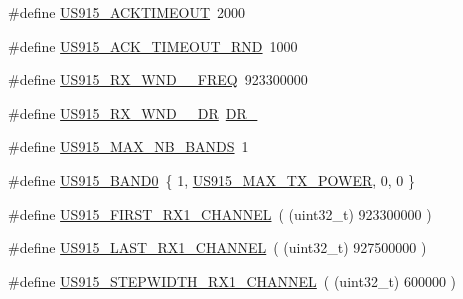\begin{DoxyCompactItemize}
\item 
\#define \hyperlink{group__REGIONUS915_ga4c39b2179e634fc588eb206e5b24fb8e}{U\+S915\+\_\+\+A\+C\+K\+T\+I\+M\+E\+O\+UT}~2000
\item 
\#define \hyperlink{group__REGIONUS915_ga96a643ec88acfe0188587fd0ed6251e5}{U\+S915\+\_\+\+A\+C\+K\+\_\+\+T\+I\+M\+E\+O\+U\+T\+\_\+\+R\+ND}~1000
\item 
\#define \hyperlink{group__REGIONUS915_ga0789b26b7a379ca9e5b13782bed55879}{U\+S915\+\_\+\+R\+X\+\_\+\+W\+N\+D\+\_\+\_\+\+F\+R\+EQ}~923300000
\item 
\#define \hyperlink{group__REGIONUS915_ga51bf1d4da5e2926fb30c0e7b2eb3fcf3}{U\+S915\+\_\+\+R\+X\+\_\+\+W\+N\+D\+\_\+\_\+\+DR}~\hyperlink{group__REGION_ga44cc96ba80ae464cd9330b784d329c16}{D\+R\+\_}
\item 
\#define \hyperlink{group__REGIONUS915_ga85b21b9c0af1bca8fb301bedf0be8fb7}{U\+S915\+\_\+\+M\+A\+X\+\_\+\+N\+B\+\_\+\+B\+A\+N\+DS}~1
\item 
\#define \hyperlink{group__REGIONUS915_gafaab05d04cd5aa9b96a16ffd6b129c93}{U\+S915\+\_\+\+B\+A\+N\+D0}~\{ 1, \hyperlink{group__REGIONUS915_gaa43b92e4e5cf26691dda96f7c4969c25}{U\+S915\+\_\+\+M\+A\+X\+\_\+\+T\+X\+\_\+\+P\+O\+W\+ER}, 0,  0 \}
\item 
\#define \hyperlink{group__REGIONUS915_ga8960a091cbb30429c6b69d4d528930d6}{U\+S915\+\_\+\+F\+I\+R\+S\+T\+\_\+\+R\+X1\+\_\+\+C\+H\+A\+N\+N\+EL}~( (uint32\+\_\+t) 923300000 )
\item 
\#define \hyperlink{group__REGIONUS915_ga705af2829d7167acf3900be2b3c76dbb}{U\+S915\+\_\+\+L\+A\+S\+T\+\_\+\+R\+X1\+\_\+\+C\+H\+A\+N\+N\+EL}~( (uint32\+\_\+t) 927500000 )
\item 
\#define \hyperlink{group__REGIONUS915_ga3840fba7fb88e029a0679cbc320552bf}{U\+S915\+\_\+\+S\+T\+E\+P\+W\+I\+D\+T\+H\+\_\+\+R\+X1\+\_\+\+C\+H\+A\+N\+N\+EL}~( (uint32\+\_\+t) 600000 )
\end{DoxyCompactItemize}
